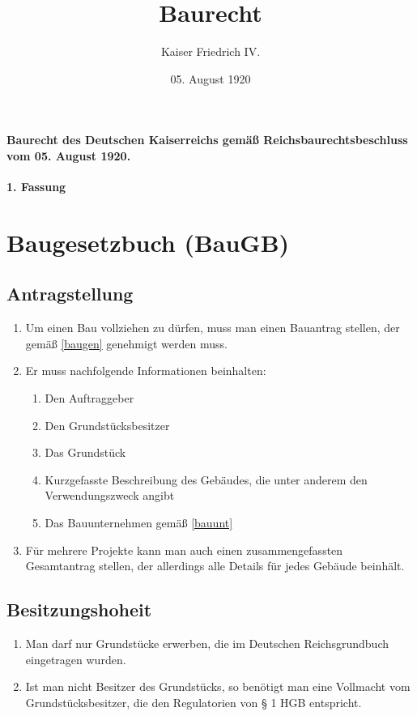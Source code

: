\documentclass{article}
\title{Baurecht}
\author{Kaiser Friedrich IV.}
\date{05. August 1920}
\begin{document}
\maketitle
\vspace*{\fill}
\paragraph{Baurecht des Deutschen Kaiserreichs gemäß Reichsbaurechtsbeschluss vom 05. August 1920.}

\newpage
{}
\vspace*{\fill}
\begin{Center}
\textbf{1. Fassung}
\vspace*{\fill}
\end{Center}
\newpage
\tableofcontents
\newpage
\section{Baugesetzbuch (BauGB)}
\localtableofcontents

\subsection{Antragstellung}
\begin{enumerate}[(1)]
    \item Um einen Bau vollziehen zu dürfen, muss man einen Bauantrag stellen, der gemäß \ref{baugen} genehmigt werden muss.
    \item Er muss nachfolgende Informationen beinhalten:
    \begin{enumerate}[1.]
        \item Den Auftraggeber
        \item Den Grundstücksbesitzer
        \item Das Grundstück
        \item Kurzgefasste Beschreibung des Gebäudes, die unter anderem den Verwendungszweck angibt
        \item Das Bauunternehmen gemäß \ref{bauunt}
    \end{enumerate}
    \item Für mehrere Projekte kann man auch einen zusammengefassten Gesamtantrag stellen, der allerdings alle Details für jedes Gebäude beinhält.
\end{enumerate}

\subsection{Besitzungshoheit}
\begin{enumerate}[(1)]
    \item Man darf nur Grundstücke erwerben, die im Deutschen Reichsgrundbuch eingetragen wurden.
    \item Ist man nicht Besitzer des Grundstücks, so benötigt man eine Vollmacht vom Grundstücksbesitzer, die den Regulatorien von § 1 HGB entspricht.
\end{enumerate}
\end{document}
